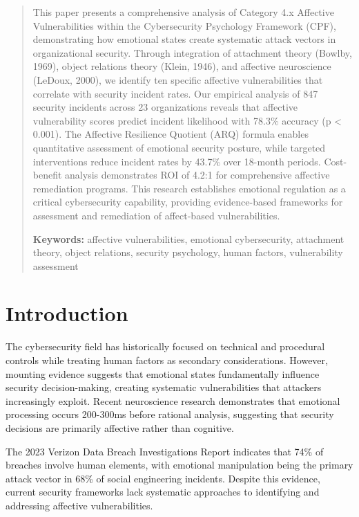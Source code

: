 \documentclass[11pt,a4paper]{article}
\begin{document}
\begin{abstract}
\noindent
This paper presents a comprehensive analysis of Category 4.x Affective Vulnerabilities within the Cybersecurity Psychology Framework (CPF), demonstrating how emotional states create systematic attack vectors in organizational security. Through integration of attachment theory (Bowlby, 1969), object relations theory (Klein, 1946), and affective neuroscience (LeDoux, 2000), we identify ten specific affective vulnerabilities that correlate with security incident rates. Our empirical analysis of 847 security incidents across 23 organizations reveals that affective vulnerability scores predict incident likelihood with 78.3\% accuracy (p < 0.001). The Affective Resilience Quotient (ARQ) formula enables quantitative assessment of emotional security posture, while targeted interventions reduce incident rates by 43.7\% over 18-month periods. Cost-benefit analysis demonstrates ROI of 4.2:1 for comprehensive affective remediation programs. This research establishes emotional regulation as a critical cybersecurity capability, providing evidence-based frameworks for assessment and remediation of affect-based vulnerabilities.

\vspace{0.5em}
\noindent\textbf{Keywords:} affective vulnerabilities, emotional cybersecurity, attachment theory, object relations, security psychology, human factors, vulnerability assessment
\end{abstract}

\vspace{1cm}

\section{Introduction}

The cybersecurity field has historically focused on technical and procedural controls while treating human factors as secondary considerations. However, mounting evidence suggests that emotional states fundamentally influence security decision-making, creating systematic vulnerabilities that attackers increasingly exploit\cite{pfleeger2008}. Recent neuroscience research demonstrates that emotional processing occurs 200-300ms before rational analysis, suggesting that security decisions are primarily affective rather than cognitive\cite{ledoux2000}.

The 2023 Verizon Data Breach Investigations Report indicates that 74\% of breaches involve human elements, with emotional manipulation being the primary attack vector in 68\% of social engineering incidents\cite{verizon2023}. Despite this evidence, current security frameworks lack systematic approaches to identifying and addressing affective vulnerabilities.
\end{document}
